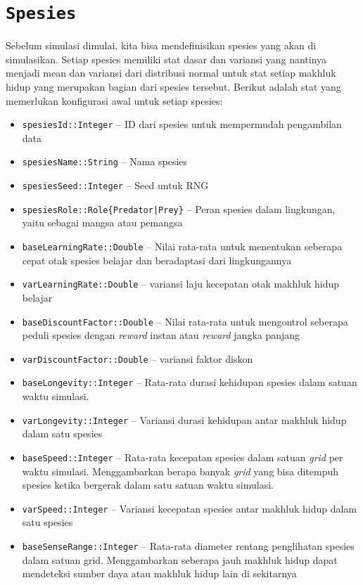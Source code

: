 \documentclass[12pt]{article}
\begin{document}
\section{\texttt{Spesies}}
Sebelum simulasi dimulai, kita bisa mendefinisikan spesies yang akan di simulasikan. Setiap spesies memiliki stat dasar dan variansi yang nantinya menjadi mean dan variansi dari distribusi normal untuk stat setiap makhluk hidup yang merupakan bagian dari spesies tersebut. Berikut adalah stat yang memerlukan konfigurasi awal untuk setiap spesies: 
\begin{itemize}
    \item \texttt{spesiesId::Integer} -- ID dari spesies untuk mempermudah pengambilan data
    \item \texttt{spesiesName::String} -- Nama spesies
    \item \texttt{spesiesSeed::Integer} -- Seed untuk RNG
    \item \texttt{spesiesRole::Role\{Predator|Prey\}} -- Peran spesies dalam lingkungan, yaitu sebagai mangsa atau pemangsa
    \item \texttt{baseLearningRate::Double} -- Nilai rata-rata untuk menentukan seberapa cepat otak spesies belajar dan beradaptasi dari lingkungannya
    \item \texttt{varLearningRate::Double} -- variansi laju kecepatan otak makhluk hidup belajar
    \item \texttt{baseDiscountFactor::Double} -- Nilai rata-rata untuk mengontrol seberapa peduli spesies dengan \textit{reward} instan atau \textit{reward} jangka panjang
    \item \texttt{varDiscountFactor::Double} -- variansi faktor diskon 
    \item \texttt{baseLongevity::Integer} -- Rata-rata durasi kehidupan spesies dalam satuan waktu simulasi.
    \item \texttt{varLongevity::Integer} -- Variansi durasi kehidupan antar makhluk hidup dalam satu spesies
    \item \texttt{baseSpeed::Integer} -- Rata-rata kecepatan spesies dalam satuan \textit{grid} per waktu simulasi. Menggambarkan berapa banyak \textit{grid} yang bisa ditempuh spesies ketika bergerak dalam satu satuan waktu simulasi.
    \item \texttt{varSpeed::Integer} -- Variansi kecepatan spesies antar makhluk hidup dalam satu spesies
    \item \texttt{baseSenseRange::Integer} -- Rata-rata diameter rentang penglihatan spesies dalam satuan grid. Menggambarkan seberapa jauh makhluk hidup dapat mendeteksi sumber daya atau makhluk hidup lain di sekitarnya

\end{itemize}
\end{document}
